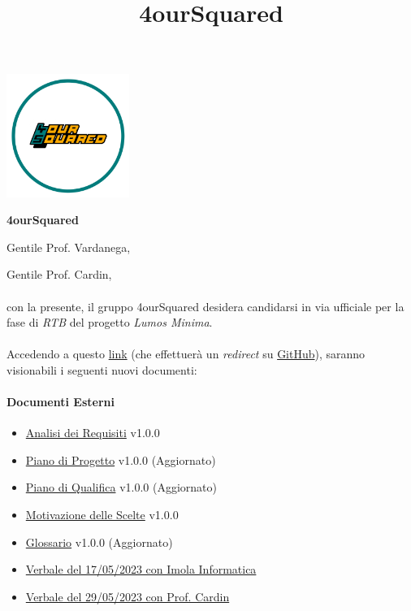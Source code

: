 \documentclass[12pt, a4paper]{article}
\begin{document}
\graphicspath{ {../../template} }
\title{4ourSquared}
\begin{center}
    \includegraphics[width=0.30\textwidth]{4ourSquared_logo}
\end{center}
\begin{center}
    {\Large \textbf{4ourSquared}}\\[24pt]
\end{center}


Gentile Prof. Vardanega,


Gentile Prof. Cardin,\\\\
con la presente, il gruppo 4ourSquared desidera candidarsi in via ufficiale per la fase di \textit{RTB} del progetto \textit{Lumos Minima}.\\\\
Accedendo a questo \href{https://github.com/4ourSquared/LumosMinima/tree/main/public}{link} (che effettuerà un \textit{redirect} su \href{https://github.com/}{GitHub}), saranno visionabili i seguenti nuovi documenti:
\paragraph{Documenti Esterni}
\begin{itemize}
    \item \href{https://github.com/4ourSquared/LumosMinima/tree/main/public/esterni/analisi_dei_requisiti_v1.pdf}{Analisi dei Requisiti} v1.0.0
    \item \href{https://github.com/4ourSquared/LumosMinima/tree/main/public/esterni/piano_di_progetto_v1.pdf}{Piano di Progetto} v1.0.0 (Aggiornato)
    \item \href{https://github.com/4ourSquared/LumosMinima/tree/main/public/esterni/piano_di_qualifica_v1.pdf}{Piano di Qualifica} v1.0.0 (Aggiornato)
    \item \href{https://github.com/4ourSquared/LumosMinima/tree/main/public/esterni/motivazione_scelte_v1.pdf}{Motivazione delle Scelte} v1.0.0
    \item \href{https://github.com/4ourSquared/LumosMinima/tree/main/public/esterni/glossario_v1.pdf}{Glossario} v1.0.0 (Aggiornato)
    \item \href{https://github.com/4ourSquared/LumosMinima/tree/main/public/esterni/verbali/2023_05_17_E.pdf}{Verbale del 17/05/2023 con Imola Informatica}
    \item \href{https://github.com/4ourSquared/LumosMinima/tree/main/public/esterni/verbali/2023_05_29_E.pdf}{Verbale del 29/05/2023 con Prof. Cardin}
\end{itemize}
\end{document}
